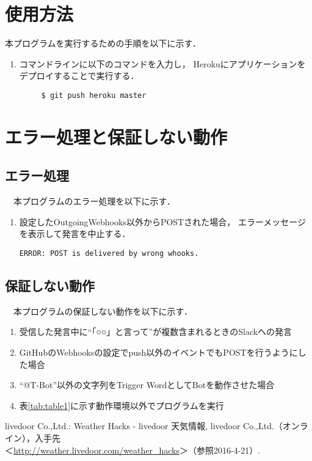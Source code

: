 \documentclass[fleqn, 14pt]{sty/extarticlej}
\begin{document}
\section{使用方法}
\label{使用方法}
本プログラムを実行するための手順を以下に示す．
\begin{enumerate}
\item コマンドラインに以下のコマンドを入力し，
  Herokuにアプリケーションをデプロイすることで実行する．
\begin{verbatim}
     $ git push heroku master
\end{verbatim}
\end{enumerate}

\section{エラー処理と保証しない動作}
\label{エラー処理と保証しない動作}
\subsection{エラー処理}
　本プログラムのエラー処理を以下に示す．
\begin{enumerate}
\item 設定したOutgoingWebhooks以外からPOSTされた場合，
  エラーメッセージを表示して発言を中止する．
\begin{verbatim}
ERROR: POST is delivered by wrong whooks.
\end{verbatim}
\end{enumerate}

\subsection{保証しない動作}
　本プログラムの保証しない動作を以下に示す．
\begin{enumerate}
\item 受信した発言中に``「○○」と言って''が複数含まれるときのSlackへの発言
\item GitHubのWebhooksの設定でpush以外のイベントでもPOSTを行うようにした場合
\item ``@T-Bot''以外の文字列をTrigger WordとしてBotを動作させた場合
\item 表\ref{tab:table1}に示す動作環境以外でプログラムを実行
\end{enumerate}



\begin{thebibliography}{9}
  livedoor Co.,Ltd.: Weather Hacks - livedoor 天気情報,
  livedoor Co.,Ltd.（オンライン），入手先\\
＜\url{http://weather.livedoor.com/weather_hacks}＞（参照2016-4-21）.
\end{thebibliography}
\end{document}
